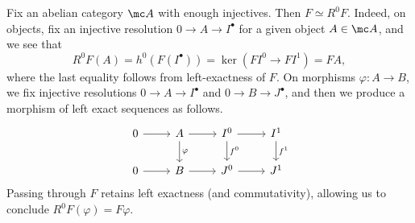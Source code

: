 \documentclass[../notes.tex]{subfiles}
\begin{document}
\begin{example}
	Fix an abelian category $\mc A$ with enough injectives. Then $F\simeq R^0F$. Indeed, on objects, fix an injective resolution $0\to A\to I^\bullet$ for a given object $A\in\mc A$, and we see that
	\[R^0F(A)=h^0(F(I^\bullet))=\ker(FI^0\to FI^1)=FA,\]
	where the last equality follows from left-exactness of $F$. On morphisms $\varphi\colon A\to B$, we fix injective resolutions $0\to A\to I^\bullet$ and $0\to B\to J^\bullet$, and then we produce a morphism of left exact sequences as follows.
	\[\begin{tikzcd}
		0 & A & {I^0} & {I^1} \\
		0 & B & {J^0} & {J^1}
		\arrow[from=1-1, to=1-2]
		\arrow[from=1-2, to=1-3]
		\arrow[from=1-3, to=1-4]
		\arrow[from=2-1, to=2-2]
		\arrow[from=2-2, to=2-3]
		\arrow[from=2-3, to=2-4]
		\arrow["\varphi", from=1-2, to=2-2]
		\arrow["{f^0}", from=1-3, to=2-3]
		\arrow["{f^1}", from=1-4, to=2-4]
	\end{tikzcd}\]
	Passing through $F$ retains left exactness (and commutativity), allowing us to conclude $R^0F(\varphi)=F\varphi$.
\end{example}
\end{document}
